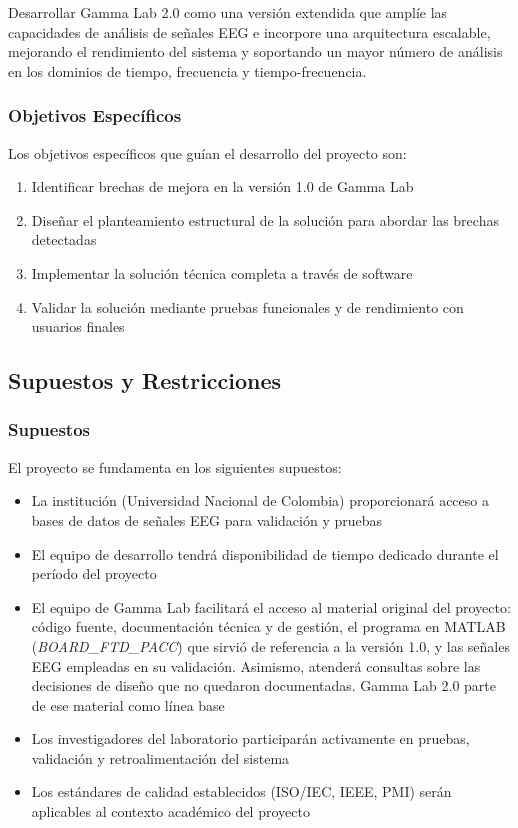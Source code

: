 \documentclass{article}
\begin{document}
Desarrollar Gamma Lab 2.0 como una versión extendida que amplíe las capacidades de análisis de señales EEG e incorpore una arquitectura escalable, mejorando el rendimiento del sistema y soportando un mayor número de análisis en los dominios de tiempo, frecuencia y tiempo-frecuencia.
 
\subsubsection{Objetivos Específicos}
 
Los objetivos específicos que guían el desarrollo del proyecto son:
 
\begin{enumerate}
    \item Identificar brechas de mejora en la versión 1.0 de Gamma Lab
    \item Diseñar el planteamiento estructural de la solución para abordar las brechas detectadas
    \item Implementar la solución técnica completa a través de software
    \item Validar la solución mediante pruebas funcionales y de rendimiento con usuarios finales
\end{enumerate}
 
\subsection{Supuestos y Restricciones}
 
\subsubsection{Supuestos}
 
El proyecto se fundamenta en los siguientes supuestos:
 
\begin{itemize}
    \item La institución (Universidad Nacional de Colombia) proporcionará acceso a bases de datos de señales EEG para validación y pruebas
    \item El equipo de desarrollo tendrá disponibilidad de tiempo dedicado durante el período del proyecto
    \item El equipo de Gamma Lab facilitará el acceso al material original del proyecto: código fuente, documentación técnica y de gestión, el programa en MATLAB (\textit{BOARD\_FTD\_PACC}) que sirvió de referencia a la versión 1.0, y las señales EEG empleadas en su validación. Asimismo, atenderá consultas sobre las decisiones de diseño que no quedaron documentadas. Gamma Lab 2.0 parte de ese material como línea base
    \item Los investigadores del laboratorio participarán activamente en pruebas, validación y retroalimentación del sistema
    \item Los estándares de calidad establecidos (ISO/IEC, IEEE, PMI) serán aplicables al contexto académico del proyecto
\end{itemize}
 
\end{document}
